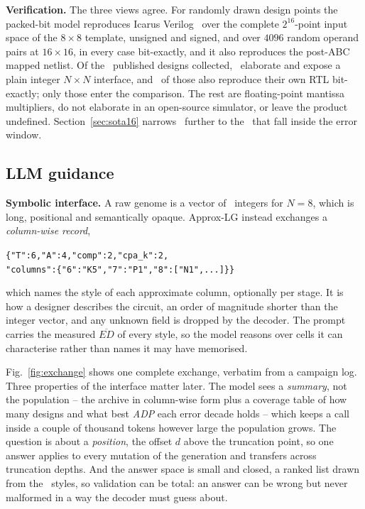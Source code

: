 \documentclass[acmsmall,review,anonymous]{acmart}
\newcommand{\adp}{\textit{ADP}}
\begin{document}
\textbf{Verification.}  The three views agree.  For randomly drawn design
points the packed-bit model reproduces Icarus Verilog~\cite{iverilog} over the
complete $2^{16}$-point input space of the $8\times8$ template, unsigned and
signed, and over $4096$ random operand pairs at $16\times16$, in every case
bit-exactly, and it also reproduces the post-ABC mapped netlist.  Of the
\NlibTotal\ published designs collected, \NlibElaborate\ elaborate and expose a
plain integer $N\times N$ interface, and \NlibVerified\ of those also reproduce
their own RTL bit-exactly; only those enter the comparison.  The rest are
floating-point mantissa multipliers, do not elaborate in an open-source
simulator, or leave the product undefined.  Section~\ref{sec:sota16} narrows
\NlibVerified\ further to the \NlibUsed\ that fall inside the error window.

\subsection{LLM guidance}
\label{sec:llm}
\textbf{Symbolic interface.}  A raw genome is a vector of \GenesEight\
integers for $N=8$, which is long, positional and semantically opaque.
Approx-LG instead exchanges a \emph{column-wise record},
\begin{center}\small
\texttt{\{"T":6,"A":4,"comp":2,"cpa\_k":2,\\
"columns":\{"6":"K5","7":"P1","8":["N1",...]\}\}}
\end{center}
which names the style of each approximate column, optionally per stage.  It is
how a designer describes the circuit, an order of magnitude shorter than the
integer vector, and any unknown field is dropped by the decoder.  The prompt
carries the measured $\overline{ED}$ of every style, so the model reasons over
cells it can characterise rather than names it may have memorised.

Fig.~\ref{fig:exchange} shows one complete exchange, verbatim from a campaign
log.  Three properties of the interface matter later.  The model sees a
\emph{summary}, not the population -- the archive in column-wise form plus a
coverage table of how many designs and what best \adp{} each error decade holds
-- which keeps a call inside a couple of thousand tokens however large the
population grows.  The question is about a \emph{position}, the offset $d$
above the truncation point, so one answer applies to every mutation of the
generation and transfers across truncation depths.  And the answer space is
small and closed, a ranked list drawn from the \Nmodes\ styles, so validation
can be total: an answer can be wrong but never malformed in a way the decoder
must guess about.
\end{document}
